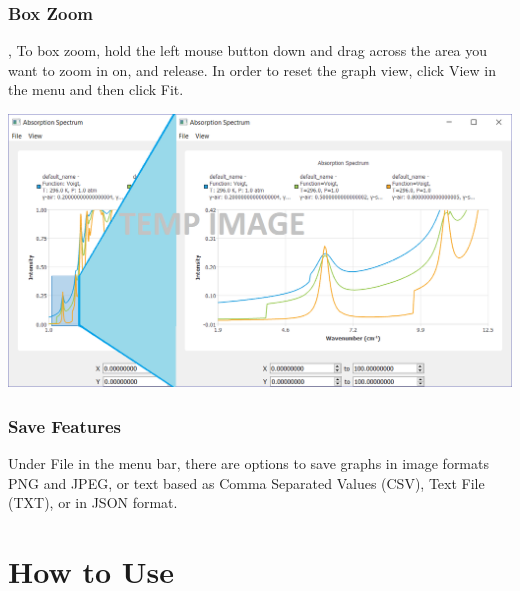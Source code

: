 \documentclass[12pt]{article}
\begin{document}
\subsubsection*{Box Zoom},
To box zoom, hold the left mouse button down and drag across the area you want to zoom in on, and release. In order to reset the graph view, click View in the menu and then click Fit.
\begin{center}
\includegraphics[scale = 0.5]{GraphDemo}
\end{center}

\subsubsection*{Save Features}
Under File in the menu bar, there are options to save graphs in image formats PNG and JPEG, or  text based as Comma Separated Values (CSV), Text File (TXT), or in JSON format.
\newpage

\section{How to Use}
\end{document}
